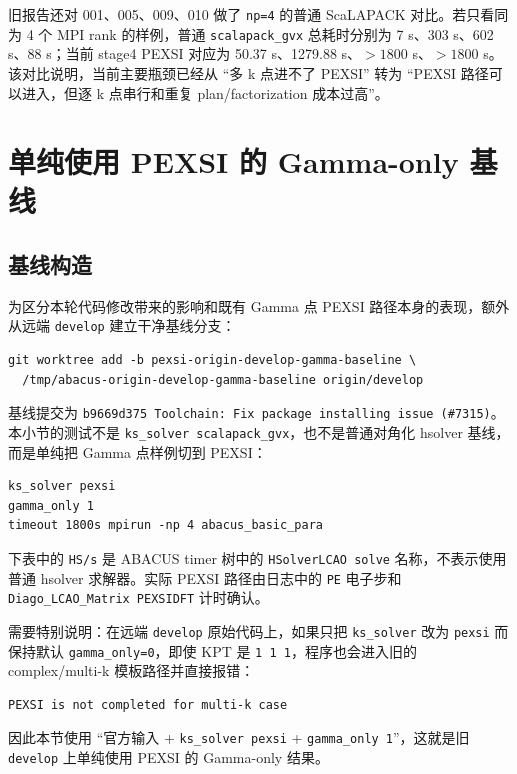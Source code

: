 \documentclass[a4paper,11pt]{article}
\newcommand{\code}[1]{\texttt{#1}}
\begin{document}
旧报告还对 001、005、009、010 做了 \code{np=4} 的普通 ScaLAPACK 对比。若只看同为 4 个 MPI rank 的样例，普通 \code{scalapack\_gvx} 总耗时分别为 7 s、303 s、602 s、88 s；当前 stage4 PEXSI 对应为 50.37 s、1279.88 s、\(>1800\) s、\(>1800\) s。该对比说明，当前主要瓶颈已经从 ``多 k 点进不了 PEXSI'' 转为 ``PEXSI 路径可以进入，但逐 k 点串行和重复 plan/factorization 成本过高''。

\section{单纯使用 PEXSI 的 Gamma-only 基线}

\subsection{基线构造}

为区分本轮代码修改带来的影响和既有 Gamma 点 PEXSI 路径本身的表现，额外从远端 \code{develop} 建立干净基线分支：

\begin{verbatim}
git worktree add -b pexsi-origin-develop-gamma-baseline \
  /tmp/abacus-origin-develop-gamma-baseline origin/develop
\end{verbatim}

基线提交为 \code{b9669d375 Toolchain: Fix package installing issue (\#7315)}。本小节的测试不是 \code{ks\_solver scalapack\_gvx}，也不是普通对角化 hsolver 基线，而是单纯把 Gamma 点样例切到 PEXSI：

\begin{verbatim}
ks_solver pexsi
gamma_only 1
timeout 1800s mpirun -np 4 abacus_basic_para
\end{verbatim}

下表中的 \code{HS/s} 是 ABACUS timer 树中的 \code{HSolverLCAO solve} 名称，不表示使用普通 hsolver 求解器。实际 PEXSI 路径由日志中的 \code{PE} 电子步和 \code{Diago\_LCAO\_Matrix PEXSIDFT} 计时确认。

需要特别说明：在远端 \code{develop} 原始代码上，如果只把 \code{ks\_solver} 改为 \code{pexsi} 而保持默认 \code{gamma\_only=0}，即使 KPT 是 \code{1 1 1}，程序也会进入旧的 complex/multi-k 模板路径并直接报错：

\begin{verbatim}
PEXSI is not completed for multi-k case
\end{verbatim}

因此本节使用 ``官方输入 + \code{ks\_solver pexsi} + \code{gamma\_only 1}''，这就是旧 \code{develop} 上单纯使用 PEXSI 的 Gamma-only 结果。
\end{document}
